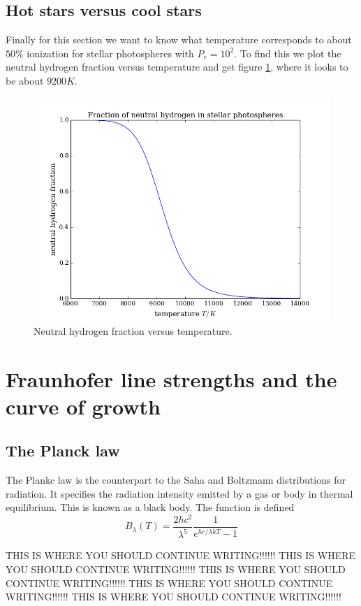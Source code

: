 \documentclass{aa}   %
\begin{document}
\subsection{Hot stars versus cool stars}
Finally for this section we want to know what temperature corresponds to about $50\%$ ionization for stellar photospheres with $P_e = 10^2$. To find this we plot the neutral hydrogen fraction versus temperature and get figure \ref{hydrogen_ionization}, where it looks to be about $9200 K$.
\begin{figure}
 \includegraphics[width=.49\textwidth]{hydrogen_ionization.png}
 \caption{Neutral hydrogen fraction versus temperature.}
 \label{hydrogen_ionization}
\end{figure}
\section{Fraunhofer line strengths and the curve of growth}   \label{sec:Fraunhofer}
\subsection{The Planck law}
The Plankc law is the counterpart to the Saha and Boltzmann distributions for radiation. It specifies the radiation intensity emitted by a gas or body in thermal equilibrium. This is known as a black body. The function is defined
\begin{equation}
 B_\lambda(T) = \frac{2hc^2}{\lambda^5}\frac{1}{e^{hc/\lambda kT}-1}
\end{equation}\label{Planck}

THIS IS WHERE YOU SHOULD CONTINUE WRITING!!!!!!
THIS IS WHERE YOU SHOULD CONTINUE WRITING!!!!!!
THIS IS WHERE YOU SHOULD CONTINUE WRITING!!!!!!
THIS IS WHERE YOU SHOULD CONTINUE WRITING!!!!!!
THIS IS WHERE YOU SHOULD CONTINUE WRITING!!!!!!
\end{document}
